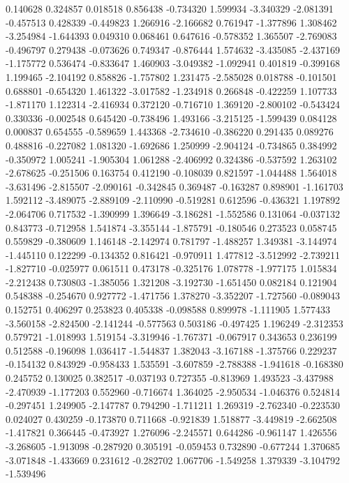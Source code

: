 0.140628
0.324857
0.018518
0.856438
-0.734320
1.599934
-3.340329
-2.081391
-0.457513
0.428339
-0.449823
1.266916
-2.166682
0.761947
-1.377896
1.308462
-3.254984
-1.644393
0.049310
0.068461
0.647616
-0.578352
1.365507
-2.769083
-0.496797
0.279438
-0.073626
0.749347
-0.876444
1.574632
-3.435085
-2.437169
-1.175772
0.536474
-0.833647
1.460903
-3.049382
-1.092941
0.401819
-0.399168
1.199465
-2.104192
0.858826
-1.757802
1.231475
-2.585028
0.018788
-0.101501
0.688801
-0.654320
1.461322
-3.017582
-1.234918
0.266848
-0.422259
1.107733
-1.871170
1.122314
-2.416934
0.372120
-0.716710
1.369120
-2.800102
-0.543424
0.330336
-0.002548
0.645420
-0.738496
1.493166
-3.215125
-1.599439
0.084128
0.000837
0.654555
-0.589659
1.443368
-2.734610
-0.386220
0.291435
0.089276
0.488816
-0.227082
1.081320
-1.692686
1.250999
-2.904124
-0.734865
0.384992
-0.350972
1.005241
-1.905304
1.061288
-2.406992
0.324386
-0.537592
1.263102
-2.678625
-0.251506
0.163754
0.412190
-0.108039
0.821597
-1.044488
1.564018
-3.631496
-2.815507
-2.090161
-0.342845
0.369487
-0.163287
0.898901
-1.161703
1.592112
-3.489075
-2.889109
-2.110990
-0.519281
0.612596
-0.436321
1.197892
-2.064706
0.717532
-1.390999
1.396649
-3.186281
-1.552586
0.131064
-0.037132
0.843773
-0.712958
1.541874
-3.355144
-1.875791
-0.180546
0.273523
0.058745
0.559829
-0.380609
1.146148
-2.142974
0.781797
-1.488257
1.349381
-3.144974
-1.445110
0.122299
-0.134352
0.816421
-0.970911
1.477812
-3.512992
-2.739211
-1.827710
-0.025977
0.061511
0.473178
-0.325176
1.078778
-1.977175
1.015834
-2.212438
0.730803
-1.385056
1.321208
-3.192730
-1.651450
0.082184
0.121904
0.548388
-0.254670
0.927772
-1.471756
1.378270
-3.352207
-1.727560
-0.089043
0.152751
0.406297
0.253823
0.405338
-0.098588
0.899978
-1.111905
1.577433
-3.560158
-2.824500
-2.141244
-0.577563
0.503186
-0.497425
1.196249
-2.312353
0.579721
-1.018993
1.519154
-3.319946
-1.767371
-0.067917
0.343653
0.236199
0.512588
-0.196098
1.036417
-1.544837
1.382043
-3.167188
-1.375766
0.229237
-0.154132
0.843929
-0.958433
1.535591
-3.607859
-2.788388
-1.941618
-0.168380
0.245752
0.130025
0.382517
-0.037193
0.727355
-0.813969
1.493523
-3.437988
-2.470939
-1.177203
0.552960
-0.716674
1.364025
-2.950534
-1.046376
0.524814
-0.297451
1.249905
-2.147787
0.794290
-1.711211
1.269319
-2.762340
-0.223530
0.024027
0.430259
-0.173870
0.711668
-0.921839
1.518877
-3.449819
-2.662508
-1.417821
0.366445
-0.473927
1.276096
-2.245571
0.644286
-0.961147
1.426556
-3.268605
-1.913098
-0.287920
0.305191
-0.059453
0.732890
-0.677244
1.370685
-3.071848
-1.433669
0.231612
-0.282702
1.067706
-1.549258
1.379339
-3.104792
-1.539496
